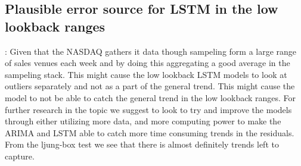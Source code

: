 \subsection{Plausible error source for LSTM in the low lookback ranges}:
Given that the NASDAQ gathers it data though sampeling form a large range of sales venues each week and by doing this aggregating a good average in the sampeling stack. This might cause the low lookback LSTM models to look at outliers separately and not as a part of the general trend. This might cause the model to not be able to catch the general trend in the low lookback ranges.
For further research in the topic we suggest to look to try and improve the models through either utilizing more data, and more computing power to make the ARIMA and LSTM able to catch more time consuming trends in the residuals. From the ljung-box test we see that there is almost definitely trends left to capture.

